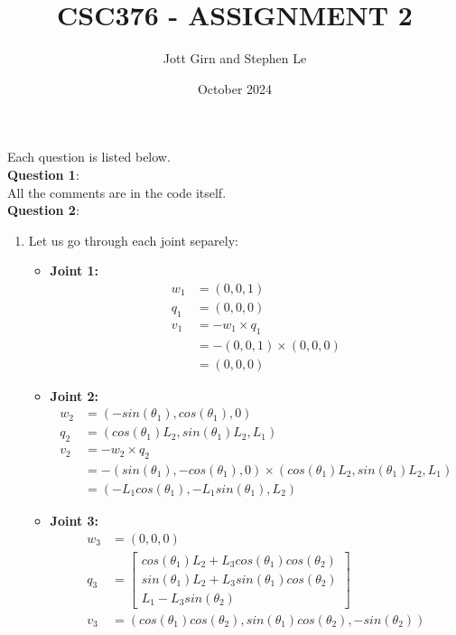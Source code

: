 \documentclass{article}
\title{CSC376 - ASSIGNMENT 2}
\author{Jott Girn and Stephen Le}
\date{October 2024}
\begin{document}
 \maketitle 
Each question is listed below.\\
\textbf{Question 1}:\\
All the comments are in the code itself.\\
\textbf{Question 2}:
\begin{enumerate}
    \item Let us go through each joint separely:
    \begin{itemize}
        \item \textbf{Joint 1:}\\
        \begin{align}
            w_1 &= (0,0,1)\\
            q_1 &= (0,0,0)\\
            v_1 &= -w_1 \times q_1 \\
            &= -(0,0,1) \times (0,0,0)\\
            &= (0,0,0)
        \end{align}
        \item \textbf{Joint 2:}\\
        \begin{align}
            w_2 &= (-sin(\theta_1),cos(\theta_1), 0)\\
            q_2 &= (cos(\theta_1)L_2,sin(\theta_1)L_2, L_1)\\
            v_2 &= -w_2 \times q_2 \\
            &= -(sin(\theta_1),-cos(\theta_1), 0) \times (cos(\theta_1)L_2,sin(\theta_1)L_2, L_1)\\
            &= (-L_1cos(\theta_1), -L_1 sin(\theta_1), L_2)
        \end{align}
        \item \textbf{Joint 3:}\\
        \begin{align}
            w_3 &= (0,0,0)\\
            q_3 &= \begin{bmatrix}
          cos(\theta_1)L_2 + L_3cos(\theta_1)cos(\theta_2)  \\
           sin(\theta_1)L_2 + L_3sin(\theta_1)cos(\theta_2)\\
           L_1 - L_3 sin(\theta_2)
         \end{bmatrix}\\
            v_3 & = (cos(\theta_1)cos(\theta_2), sin(\theta_1)cos(\theta_2), -sin(\theta_2))

\end{align}
\end{itemize}
\end{enumerate}
\end{document}
